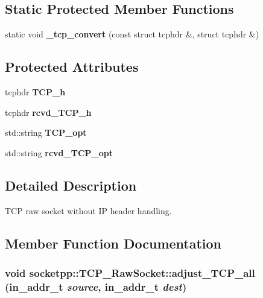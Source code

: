 \subsection*{Static Protected Member Functions}
\begin{CompactItemize}
\item 
\hypertarget{classsocketpp_1_1TCP__RawSocket_d8fd5e353a5960c652bd16a51840f148}{
static void \textbf{\_\-tcp\_\-convert} (const struct tcphdr \&, struct tcphdr \&)}
\label{classsocketpp_1_1TCP__RawSocket_d8fd5e353a5960c652bd16a51840f148}

\end{CompactItemize}
\subsection*{Protected Attributes}
\begin{CompactItemize}
\item 
\hypertarget{classsocketpp_1_1TCP__RawSocket_d1980411bd147dd67f6d9d9578414c17}{
tcphdr \textbf{TCP\_\-h}}
\label{classsocketpp_1_1TCP__RawSocket_d1980411bd147dd67f6d9d9578414c17}

\item 
\hypertarget{classsocketpp_1_1TCP__RawSocket_12b2d2f00d02c377301fc10e1209a8b8}{
tcphdr \textbf{rcvd\_\-TCP\_\-h}}
\label{classsocketpp_1_1TCP__RawSocket_12b2d2f00d02c377301fc10e1209a8b8}

\item 
\hypertarget{classsocketpp_1_1TCP__RawSocket_380529364d9488faf998543d433d8fe6}{
std::string \textbf{TCP\_\-opt}}
\label{classsocketpp_1_1TCP__RawSocket_380529364d9488faf998543d433d8fe6}

\item 
\hypertarget{classsocketpp_1_1TCP__RawSocket_b7bddcb31a7a310bcf61fcc474ded465}{
std::string \textbf{rcvd\_\-TCP\_\-opt}}
\label{classsocketpp_1_1TCP__RawSocket_b7bddcb31a7a310bcf61fcc474ded465}

\end{CompactItemize}


\subsection{Detailed Description}
TCP raw socket without IP header handling. 

\subsection{Member Function Documentation}
\hypertarget{classsocketpp_1_1TCP__RawSocket_0a1017145ae76253dfca51cbd672fae7}{
\subsubsection[{adjust\_\-TCP\_\-all}]{\setlength{\rightskip}{0pt plus 5cm}void socketpp::TCP\_\-RawSocket::adjust\_\-TCP\_\-all (in\_\-addr\_\-t {\em source}, \/  in\_\-addr\_\-t {\em dest})}}
\label{classsocketpp_1_1TCP__RawSocket_0a1017145ae76253dfca51cbd672fae7}


